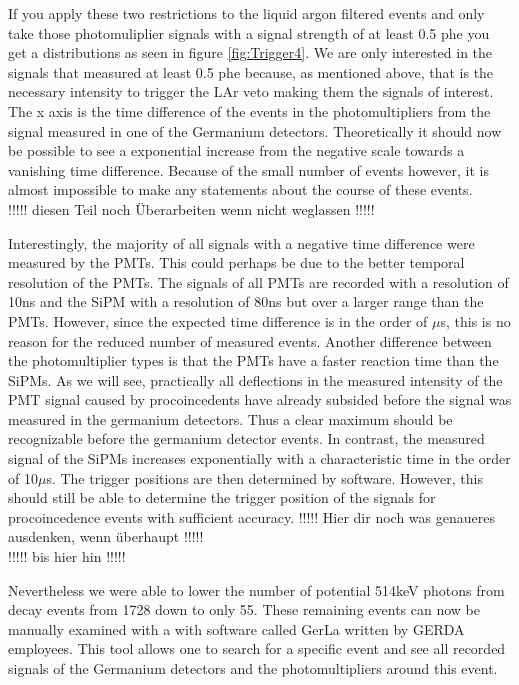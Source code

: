 \documentclass[encoding=utf8,british]{tumphthesis}
\begin{document}
If you apply these two restrictions to the liquid argon filtered events and only take those photomuliplier signals with a signal strength of at least 0.5 phe you get a distributions as seen in figure \ref{fig:Trigger4}.
We are only interested in the signals that measured at least 0.5 phe because, as mentioned above, that is the necessary intensity to trigger the LAr veto making them the signals of interest. 
The x axis is the time difference of the events in the photomultipliers from the signal measured in one of the Germanium detectors.
Theoretically it should now be possible to see a exponential increase from the negative scale towards a vanishing time difference.
Because of the small number of events however, it is almost impossible to make any statements about the course of these events.
\\

!!!!! diesen Teil noch Überarbeiten wenn nicht weglassen !!!!!

Interestingly, the majority of all signals with a negative time difference were measured by the PMTs. 
This could perhaps be due to the better temporal resolution of the PMTs. 
The signals of all PMTs are recorded with a resolution of 10ns and the SiPM with a resolution of 80ns but over a larger range than the PMTs\cite{nature}. 
However, since the expected time difference is in the order of \(\mu\)s, this is no reason for the reduced number of measured events. 
Another difference between the photomultiplier types is that the PMTs have a faster reaction time than the SiPMs. 
As we will see, practically all deflections in the measured intensity of the PMT signal caused by procoincedents have already subsided before the signal was measured in the germanium detectors. 
Thus a clear maximum should be recognizable before the germanium detector events.
In contrast, the measured signal of the SiPMs increases exponentially with a characteristic time in the order of 10\(\mu\)s. 
The trigger positions are then determined by software. 
However, this should still be able to determine the trigger position of the signals for procoincedence events with sufficient accuracy.
!!!!! Hier dir noch was genaueres ausdenken, wenn überhaupt !!!!!
\\

!!!!! bis hier hin !!!!!

Nevertheless we were able to lower the number of potential 514keV photons from \Kr decay events from 1728 down to only 55.  
These remaining events can now be manually examined with a with software called GerLa written by GERDA employees.
This tool allows one to search for a specific event and see all recorded signals of the Germanium detectors and the photomultipliers around this event.
\\
\end{document}
